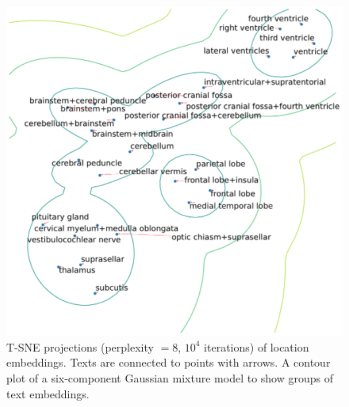 \begin{figure}
    \centering
    \includegraphics[width=\linewidth]{pediatric-brain-tumours/images/tsne-cc.pdf}
    \caption[T-SNE projections of location embeddings]{
        T-SNE projections (perplexity $= 8$, $10^4$ iterations) of location embeddings.
        Texts are connected to points with arrows.
        A contour plot of a six-component Gaussian mixture model to show groups of text embeddings.
    }
    \label{fig:tsne-cc}
\end{figure}
